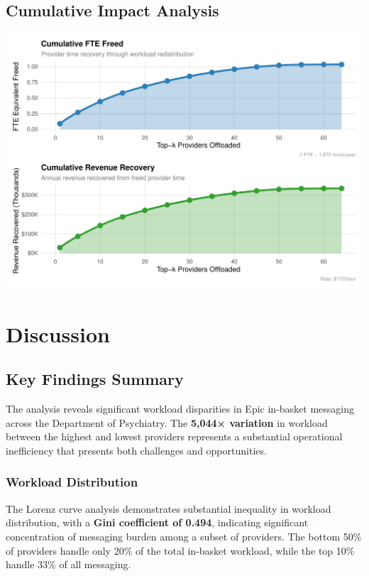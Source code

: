 \documentclass[
  11pt,
]{article}
\begin{document}
\subsection{Cumulative Impact
Analysis}\label{cumulative-impact-analysis}

\begin{center}
\includegraphics[width=1\textwidth,height=\textheight]{comprehensive-analysis-report_files/figure-pdf/cumulative-impact-1.pdf}
\end{center}

\section{Discussion}\label{discussion}

\subsection{Key Findings Summary}\label{key-findings-summary}

The analysis reveals significant workload disparities in Epic in-basket
messaging across the Department of Psychiatry. The \textbf{5,044×
variation} in workload between the highest and lowest providers
represents a substantial operational inefficiency that presents both
challenges and opportunities.

\subsubsection{Workload Distribution}\label{workload-distribution}

The Lorenz curve analysis demonstrates substantial inequality in
workload distribution, with a \textbf{Gini coefficient of 0.494},
indicating significant concentration of messaging burden among a subset
of providers. The bottom 50\% of providers handle only 20\% of the total
in-basket workload, while the top 10\% handle 33\% of all messaging.
\end{document}
